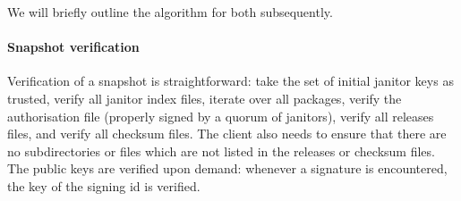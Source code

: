 \documentclass[nocopyrightspace]{sigplanconf}
\begin{document}
We will briefly outline the algorithm for both subsequently.

\paragraph{Snapshot verification}  Verification of a snapshot is straightforward: take the set of initial janitor keys as trusted, verify all janitor index files, iterate over all packages, verify the authorisation file (properly signed by a quorum of janitors), verify all releases files, and verify all checksum files.
The client also needs to ensure that there are no subdirectories or files which are not listed in the releases or checksum files.
The public keys are verified upon demand: whenever a signature is encountered, the key of the signing id is verified.
\end{document}
